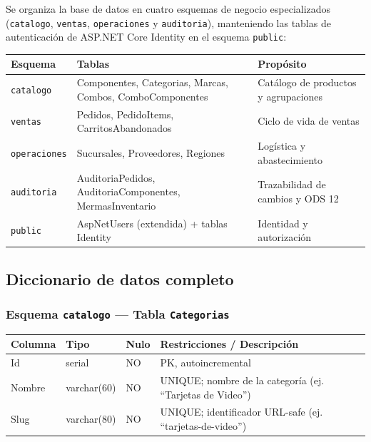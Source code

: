 Se organiza la base de datos en cuatro esquemas de negocio especializados (\texttt{catalogo}, \texttt{ventas}, \texttt{operaciones} y \texttt{auditoria}), manteniendo las tablas de autenticaci\'on de ASP.NET Core Identity en el esquema \texttt{public}:

\begin{center}
\begin{tablaAPA}
\begin{tabular}{L{2.8cm} L{5.5cm} L{5.5cm}}
\toprule
\textbf{Esquema} & \textbf{Tablas} & \textbf{Prop\'osito} \\
\midrule
\texttt{catalogo} & Componentes, Categorias, Marcas, Combos, ComboComponentes & Cat\'alogo de productos y agrupaciones \\
\texttt{ventas} & Pedidos, PedidoItems, CarritosAbandonados & Ciclo de vida de ventas \\
\texttt{operaciones} & Sucursales, Proveedores, Regiones & Log\'istica y abastecimiento \\
\texttt{auditoria} & AuditoriaPedidos, AuditoriaComponentes, MermasInventario & Trazabilidad de cambios y ODS 12 \\
\texttt{public} & AspNetUsers (extendida) + tablas Identity & Identidad y autorizaci\'on \\
\bottomrule
\end{tabular}
\end{tablaAPA}
\label{tab:esquemas}
\end{center}

\subsection{Diccionario de datos completo}

\subsubsection{Esquema \texttt{catalogo} --- Tabla \texttt{Categorias}}

\begin{center}
\begin{tablaAPA}
\begin{tabular}{L{2.8cm} L{2.0cm} C{1.4cm} L{7.0cm}}
\toprule
\textbf{Columna} & \textbf{Tipo} & \textbf{Nulo} & \textbf{Restricciones / Descripci\'on} \\
\midrule
Id      & serial      & NO & PK, autoincremental \\
Nombre  & varchar(60) & NO & UNIQUE; nombre de la categor\'ia (ej. ``Tarjetas de Video'') \\
Slug    & varchar(80) & NO & UNIQUE; identificador URL-safe (ej. ``tarjetas-de-video'') \\
\bottomrule
\end{tabular}
\end{tablaAPA}
\label{tab:dict-categorias}
\end{center}

